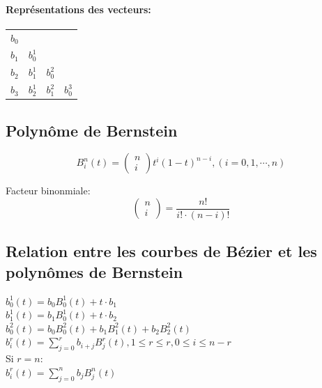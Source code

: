 \documentclass[a4paper,9pt]{extarticle}
\begin{document}
\begin{multicols*}{2}
\paragraph*{Représentations des vecteurs:}
\begin{tabular}{llll}
$b_0$ &         &         & \\
$b_1$ & $b_0^1$ &         & \\
$b_2$ & $b_1^1$ & $b_0^2$ & \\
$b_3$ & $b_2^1$ & $b_1^2$ & $b_0^3$
\end{tabular}
\subsection{Polynôme de Bernstein}
$$B_i^n(t) = \begin{pmatrix}n\\i\end{pmatrix}t^i(1-t)^{n-i},(i=0,1,\cdots,n) $$

Facteur binonmiale:
$$\begin{pmatrix}n\\i\end{pmatrix} = \frac{n!}{i!\cdot(n-i)!}$$

\subsection{Relation entre les courbes de Bézier et les polynômes de Bernstein}
$ b_0^1(t) = b_0B_0^1(t) + t\cdot b_1 $\\
$ b_1^1(t) = b_1B_0^1(t) + t\cdot b_2 $\\
$ b_0^2(t) = b_0B_0^2(t) + b_1B_1^2(t) + b_2B_2^2(t) $\\
$b_i^r(t) = \sum_{j=0}^r b_{i+j}B_j^r(t), 1\leq r \leq r, 0 \leq i \leq n-r$\\
Si $r=n$:\\$b_i^r(t) = \sum_{j=0}^n b_{j}B_j^n(t)$

\end{multicols*}
\end{document}
